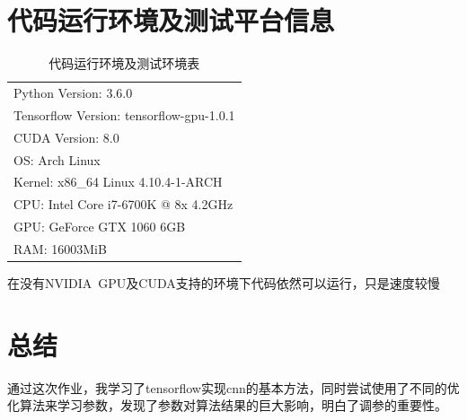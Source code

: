 \documentclass[a4paper, UTF8]{ctexrep}
\begin{document}
    \section{代码运行环境及测试平台信息}
      \begin{table}[htbp!]
        \centering
        \begin{tabular}{l}
          \hline
          Python Version: 3.6.0 \\
          Tensorflow Version: tensorflow-gpu-1.0.1 \\
          CUDA Version: 8.0 \\
          OS: Arch Linux \\
          Kernel: x86\_64 Linux 4.10.4-1-ARCH \\
          CPU: Intel Core i7-6700K @ 8x 4.2GHz \\
          GPU: GeForce GTX 1060 6GB \\
          RAM: 16003MiB \\
          \hline
        \end{tabular}
        \caption{代码运行环境及测试环境表}
      \end{table}
      在没有NVIDIA\ GPU及CUDA支持的环境下代码依然可以运行，只是速度较慢
    \section{总结}
      通过这次作业，我学习了tensorflow实现cnn的基本方法，同时尝试使用了不同的优化算法来学习参数，发现了参数对算法结果的巨大影响，明白了调参的重要性。
\end{document}
